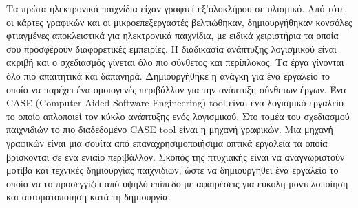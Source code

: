 	\begin{Abstract}
		Τα πρώτα ηλεκτρονικά παιχνίδια είχαν γραφτεί εξ'ολοκλήρου σε υλισμικό. Από τότε, οι κάρτες γραφικών και οι μικροεπεξεργαστές βελτιώθηκαν, δημιουργήθηκαν κονσόλες φτιαγμένες αποκλειστικά για ηλεκτρονικά παιχνίδια, με ειδικά χειριστήρια τα οποία σου προσφέρουν διαφορετικές εμπειρίες.
		Η διαδικασία ανάπτυξης λογισμικού είναι ακριβή και ο σχεδιασμός γίνεται όλο πιο σύνθετος και περίπλοκος. Τα έργα γίνονται όλο πιο απαιτητικά και δαπανηρά. Δημιουργήθηκε η ανάγκη για ένα εργαλείο το οποίο να παρέχει ένα ομοιογενές περιβάλλον για την ανάπτυξη σύνθετων έργων. 
		Ένα CASE (Computer Aided Software Engineering) tool είναι ένα λογισμικό-εργαλείο το οποίο απλοποιεί τον κύκλο ανάπτυξης ενός λογισμικού. 
		Στο τομέα του σχεδιασμού παιχνιδιών το πιο διαδεδομένο CASE tool είναι η μηχανή γραφικών. Μια μηχανή γραφικών είναι μια σουίτα από επαναχρησιμοποιήσιμα οπτικά εργαλεία τα οποία βρίσκονται σε ένα ενιαίο περιβάλλον.
		Σκοπός της πτυχιακής είναι να αναγνωριστούν μοτίβα και τεχνικές δημιουργίας παιχνιδιών, ώστε να δημιουργηθεί ένα εργαλείο το οποίο να το προσεγγίζει από υψηλό επίπεδο με αφαιρέσεις για εύκολη μοντελοποίηση και αυτοματοποίηση κατά τη δημιουργία.
	\end{Abstract}